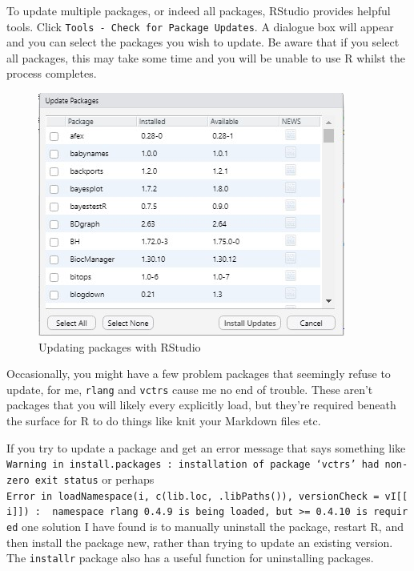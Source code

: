 \documentclass[
  oneside]{book}
\begin{document}
To update multiple packages, or indeed all packages, RStudio provides helpful tools. Click \texttt{Tools\ -\ Check\ for\ Package\ Updates}. A dialogue box will appear and you can select the packages you wish to update. Be aware that if you select all packages, this may take some time and you will be unable to use R whilst the process completes.

\begin{figure}

{\centering \includegraphics[width=1\linewidth]{images/update_packages} 

}

\caption{Updating packages with RStudio}\label{fig:img-updateall}
\end{figure}

Occasionally, you might have a few problem packages that seemingly refuse to update, for me, \texttt{rlang} and \texttt{vctrs} cause me no end of trouble. These aren't packages that you will likely every explicitly load, but they're required beneath the surface for R to do things like knit your Markdown files etc.

If you try to update a package and get an error message that says something like \texttt{Warning\ in\ install.packages\ :\ installation\ of\ package\ ‘vctrs’\ had\ non-zero\ exit\ status} or perhaps \texttt{Error\ in\ loadNamespace(i,\ c(lib.loc,\ .libPaths()),\ versionCheck\ =\ vI{[}{[}i{]}{]})\ :\ \ namespace\ \textquotesingle{}rlang\textquotesingle{}\ 0.4.9\ is\ being\ loaded,\ but\ \textgreater{}=\ 0.4.10\ is\ required} one solution I have found is to manually uninstall the package, restart R, and then install the package new, rather than trying to update an existing version. The \texttt{installr} package also has a useful function for uninstalling packages.
\end{document}
